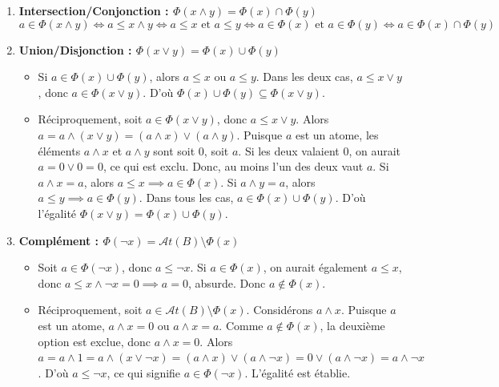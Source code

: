 \documentclass[11pt,a4paper]{article}
\begin{document}
\begin{enumerate}
\def\labelenumi{\arabic{enumi}.}
\item
  \textbf{Intersection/Conjonction :
  \(\Phi(x \land y) = \Phi(x) \cap \Phi(y)\)}
  \[a \in \Phi(x \land y) \iff a \le x \land y \iff a \le x \text{ et } a \le y \iff a \in \Phi(x) \text{ et } a \in \Phi(y) \iff a \in \Phi(x) \cap \Phi(y)\]
\item
  \textbf{Union/Disjonction : \(\Phi(x \lor y) = \Phi(x) \cup \Phi(y)\)}

  \begin{itemize}
  \tightlist
  \item
    Si \(a \in \Phi(x) \cup \Phi(y)\), alors \(a \le x\) ou \(a \le y\).
    Dans les deux cas, \(a \le x \lor y\), donc
    \(a \in \Phi(x \lor y)\). D'où
    \(\Phi(x) \cup \Phi(y) \subseteq \Phi(x \lor y)\).
  \item
    Réciproquement, soit \(a \in \Phi(x \lor y)\), donc
    \(a \le x \lor y\). Alors
    \(a = a \land (x \lor y) = (a \land x) \lor (a \land y)\). Puisque
    \(a\) est un atome, les éléments \(a \land x\) et \(a \land y\) sont
    soit \(0\), soit \(a\). Si les deux valaient \(0\), on aurait
    \(a = 0 \lor 0 = 0\), ce qui est exclu. Donc, au moins l'un des deux
    vaut \(a\). Si \(a \land x = a\), alors
    \(a \le x \implies a \in \Phi(x)\). Si \(a \land y = a\), alors
    \(a \le y \implies a \in \Phi(y)\). Dans tous les cas,
    \(a \in \Phi(x) \cup \Phi(y)\). D'où l'égalité
    \(\Phi(x \lor y) = \Phi(x) \cup \Phi(y)\).
  \end{itemize}
\item
  \textbf{Complément :
  \(\Phi(\neg x) = \mathcal{A}t(B) \setminus \Phi(x)\)}

  \begin{itemize}
  \tightlist
  \item
    Soit \(a \in \Phi(\neg x)\), donc \(a \le \neg x\). Si
    \(a \in \Phi(x)\), on aurait également \(a \le x\), donc
    \(a \le x \land \neg x = 0 \implies a = 0\), absurde. Donc
    \(a \notin \Phi(x)\).
  \item
    Réciproquement, soit \(a \in \mathcal{A}t(B) \setminus \Phi(x)\).
    Considérons \(a \land x\). Puisque \(a\) est un atome,
    \(a \land x = 0\) ou \(a \land x = a\). Comme \(a \notin \Phi(x)\),
    la deuxième option est exclue, donc \(a \land x = 0\). Alors
    \(a = a \land 1 = a \land (x \lor \neg x) = (a \land x) \lor (a \land \neg x) = 0 \lor (a \land \neg x) = a \land \neg x\).
    D'où \(a \le \neg x\), ce qui signifie \(a \in \Phi(\neg x)\).
    L'égalité est établie.
  \end{itemize}
\end{enumerate}
\end{document}
